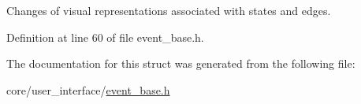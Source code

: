 Changes of visual representations associated with states and edges. 

Definition at line 60 of file event\+\_\+base.\+h.



The documentation for this struct was generated from the following file\+:\begin{DoxyCompactItemize}
\item 
core/user\+\_\+interface/\hyperlink{event__base_8h}{event\+\_\+base.\+h}\end{DoxyCompactItemize}

